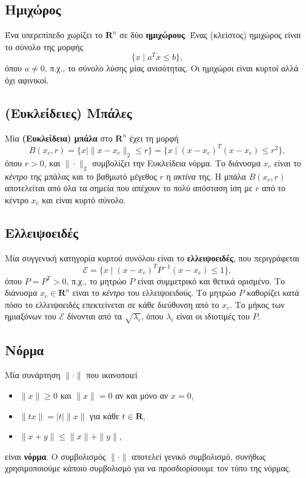 \subsection{Ημιχώρος} Ένα υπερεπίπεδο χωρίζει το $\mathbf{R}^n$ σε δύο
\textbf{ημιχώρους}. Ένας (κλείστος) ημιχώρος είναι το σύνολο της μορφής
\begin{equation*}
    \{ x \mid a^Tx \leq b \},
\end{equation*}
όπου $a \neq 0$, π.χ., το σύνολο λύσης μίας ανισότητας. Οι ημιχώροι είναι κυρτοί
αλλά όχι αφινικοί.

\subsection{(Ευκλείδειες) Μπάλες} Μία \textbf{(Ευκλείδεια) μπάλα} στο $\mathbf{R}^n$
έχει τη μορφή
\begin{equation*}
    B(x_c, r) = \{x \mid \|x - x_c\|_2 \leq r\} = \{x \mid (x - x_c)^T(x - x_c) \leq
    r^2\},
\end{equation*}
όπου $r > 0$, και $\| \cdot \|_2$ συμβολίζει την Ευκλείδεια νόρμα. Το διάνυσμα
$x_c$ είναι το \emph{κέντρο} της μπάλας και το βαθμωτό μέγεθος $r$ η
\emph{ακτίνα} της.
Η μπάλα $B(x_c, r)$ αποτελείται από όλα τα σημεία που απέχουν το πολύ απόσταση
ίση με $r$ από το κέντρο $x_c$ και είναι κυρτό σύνολο.

\subsection{Ελλειψοειδές} Μία συγγενική κατηγορία κυρτού συνόλου είναι το
\textbf{ελλειψοειδές}, που περιγράφεται
\begin{equation*}
    \mathcal{E} = \{x \mid (x - x_c)^T P^{-1}(x - x_c) \leq 1\},
\end{equation*}
όπου $P = P^T > 0$, π.χ., το μητρώο $P$ είναι συμμετρικό και θετικά ορισμένο. Το
διάνυσμα $x_c \in \mathbf{R}^n$ είναι το \emph{κέντρο} του ελλειψοειδούς. Το
μητρώο $P$ καθορίζει κατά πόσο το ελλειψοειδές επεκτείνεται σε κάθε διεύθυνση
από το $x_c$. Το μήκος των ημιαξόνων του $\mathcal{E}$ δίνονται από τα
$\sqrt{\lambda_i}$, όπου $\lambda_i$ είναι οι ιδιοτιμές του $P$.

\subsection{Νόρμα} Μία συνάρτηση $\| \cdot \|$ που ικανοποιεί
\begin{itemize}
    \item $\|x\| \geq 0$ και $\|x\| = 0$ αν και μόνο αν $x = 0$,
    \item $\|tx\| = |t|\|x\|$ για κάθε $t \in \mathbf{R}$,
    \item $\|x + y\| \leq \|x\| + \|y\|$,
\end{itemize}
είναι \textbf{νόρμα}. Ο συμβολισμός $\| \cdot \|$ αποτελεί γενικό συμβολισμό,
συνήθως χρησιμοποιούμε κάποιο συμβολισμό για να προσδιορίσουμε τον τύπο της
νόρμας.

